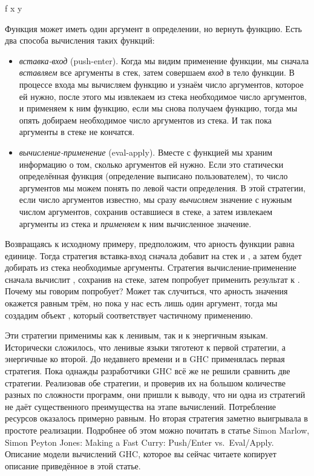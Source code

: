 \begin{code}
f x y
\end{code}

Функция  может иметь один аргумент в определении, но вернуть
функцию. Есть два способа вычисления таких функций:

\begin{itemize}
\item
  \emph{вставка-вход} (push-enter). Когда мы видим применение функции,
  мы сначала \emph{вставляем} все аргументы в стек, затем совершаем
  \emph{вход} в тело функции. В процессе входа мы вычисляем функцию
   и узнаём число аргументов, которое ей нужно, после этого мы
  извлекаем из стека необходимое число аргументов, и применяем к ним
  функцию, если мы снова получаем функцию, тогда мы опять добираем
  необходимое число аргументов из стека. И так пока аргументы в стеке не
  кончатся.
\item
  \emph{вычисление-применение} (eval-apply). Вместе с функцией мы храним
  информацию о том, сколько аргументов ей нужно. Если это статически
  определённая функция (определение выписано пользователем), то число
  аргументов мы можем понять по левой части определения. В этой
  стратегии, если число аргументов известно, мы сразу \emph{вычисляем}
  значение с нужным числом аргументов, сохранив оставшиеся в стеке, а
  затем извлекаем аргументы из стека и \emph{применяем} к ним
  вычисленное значение.
\end{itemize}

Возвращаясь к исходному примеру, предположим, что арность функции 
равна единице. Тогда стратегия вставка-вход сначала добавит на стек
 и , а затем будет добирать из стека необходимые аргументы.
Стратегия вычисление-применение сначала вычислит , сохранив
 на стеке, затем попробует применить результат к . Почему мы
говорим попробует? Может так случиться, что арность значения 
окажется равным трём, но пока у нас есть лишь один аргумент, тогда мы
создадим объект , который соответствует частичному применению.

Эти стратегии применимы как к ленивым, так и к энергичным языкам.
Исторически сложилось, что ленивые языки тяготеют к первой стратегии, а
энергичные ко второй. До недавнего времени и в GHC применялась первая
стратегия. Пока однажды разработчики GHC всё же не решили сравнить две
стратегии. Реализовав обе стратегии, и проверив их на большом количестве
разных по сложности программ, они пришли к выводу, что ни одна из
стратегий не даёт существенного преимущества на этапе вычислений.
Потребление ресурсов оказалось примерно равным. Но вторая стратегия
заметно выигрывала в простоте реализации. Подробнее об этом можно
почитать в статье Simon Marlow, Simon Peyton Jones: Making a Fast Curry:
Push/Enter vs.~Eval/Apply. Описание модели вычислений GHC, которое вы
сейчас читаете копирует описание приведённое в этой статье.


